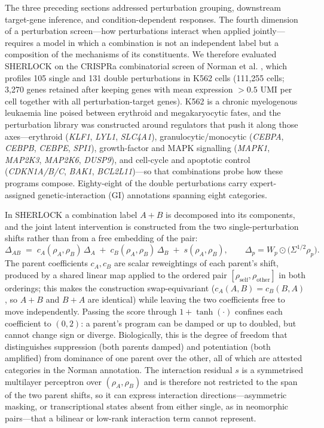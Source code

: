 The three preceding sections addressed perturbation grouping, downstream target-gene inference, and
condition-dependent responses. The fourth dimension of a perturbation screen---how perturbations
interact when applied jointly---requires a model in which a combination is not an independent label
but a composition of the mechanisms of its constituents. We therefore evaluated SHERLOCK on the
CRISPRa combinatorial screen of Norman et al. \cite{norman2019exploring}, which profiles 105 single
and 131 double perturbations in K562 cells (111,255 cells; 3,270 genes retained after keeping genes
with mean expression $>0.5$ UMI per cell together with all perturbation-target genes). K562 is a
chronic myelogenous leukaemia line poised between erythroid and megakaryocytic fates, and the
perturbation library was constructed around regulators that push it along those axes---erythroid
(\textit{KLF1}, \textit{LYL1}, \textit{SLC4A1}), granulocytic/monocytic (\textit{CEBPA},
\textit{CEBPB}, \textit{CEBPE}, \textit{SPI1}), growth-factor and MAPK signalling (\textit{MAPK1},
\textit{MAP2K3}, \textit{MAP2K6}, \textit{DUSP9}), and cell-cycle and apoptotic control
(\textit{CDKN1A/B/C}, \textit{BAK1}, \textit{BCL2L11})---so that combinations probe how these
programs compose. Eighty-eight of the double perturbations carry expert-assigned
genetic-interaction (GI) annotations spanning eight categories.

In SHERLOCK a combination label $A{+}B$ is decomposed into its components, and the joint latent
intervention is constructed from the two single-perturbation shifts rather than from a free
embedding of the pair:
\[
\Delta_{AB} \;=\; c_A(\rho_A,\rho_B)\,\Delta_A \;+\; c_B(\rho_A,\rho_B)\,\Delta_B \;+\; s(\rho_A,\rho_B),
\qquad \Delta_p = W_p \odot \big(\Sigma^{1/2}\rho_p\big).
\]
The parent coefficients $c_A,c_B$ are scalar reweightings of each parent's shift, produced by a
shared linear map applied to the ordered pair $[\rho_{\text{self}},\rho_{\text{other}}]$ in both
orderings; this makes the construction swap-equivariant ($c_A(A,B)=c_B(B,A)$, so $A{+}B$ and $B{+}A$
are identical) while leaving the two coefficients free to move independently. Passing the score
through $1+\tanh(\cdot)$ confines each coefficient to $(0,2)$: a parent's program can be damped or up
to doubled, but cannot change sign or diverge. Biologically, this is the degree of freedom that
distinguishes suppression (both parents damped) and potentiation (both amplified) from dominance of
one parent over the other, all of which are attested categories in the Norman annotation. The
interaction residual $s$ is a symmetrised multilayer perceptron over $(\rho_A,\rho_B)$ and is
therefore not restricted to the span of the two parent shifts, so it can express interaction
directions---asymmetric masking, or transcriptional states absent from either single, as in
neomorphic pairs---that a bilinear or low-rank interaction term cannot represent.

